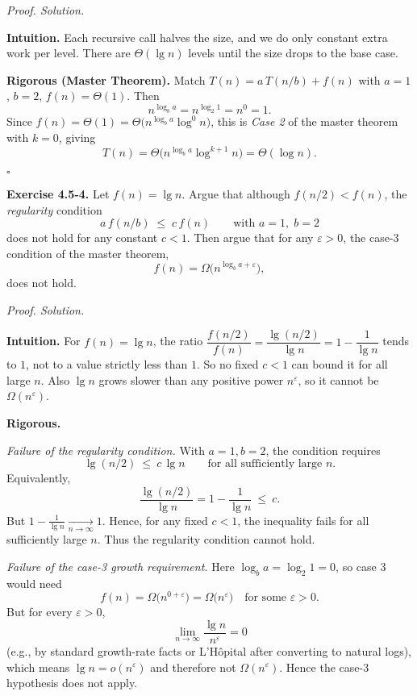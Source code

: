 \documentclass[12pt]{article}
\theoremstyle{definition}
\begin{document}
\medskip
\noindent\textit{Proof. Solution.}

\noindent\textbf{Intuition.}
Each recursive call halves the size, and we do only constant extra work per level.
There are \(\Theta(\lg n)\) levels until the size drops to the base case.

\noindent\textbf{Rigorous (Master Theorem).}
Match \(T(n)=a\,T(n/b)+f(n)\) with \(a=1\), \(b=2\), \(f(n)=\Theta(1)\).
Then
\[
n^{\log_b a}=n^{\log_2 1}=n^0=1.
\]
Since \(f(n)=\Theta(1)=\Theta\!\big(n^{\log_b a}\log^{0}\!n\big)\),
this is \emph{Case 2} of the master theorem with \(k=0\), giving
\[
T(n)=\Theta\!\big(n^{\log_b a}\log^{k+1}\!n\big)
=\Theta(\log n).
\]

\hfill$\square$

\newpage

\noindent\textbf{Exercise 4.5-4.}
Let $f(n)=\lg n$. Argue that although $f(n/2)<f(n)$, the \emph{regularity} condition
\[
a\,f(n/b)\;\le\; c\,f(n)\qquad\text{with }a=1,\;b=2
\]
does not hold for any constant $c<1$. Then argue that for any $\varepsilon>0$,
the case-3 condition of the master theorem,
\[
f(n)=\Omega\!\big(n^{\log_b a+\varepsilon}\big),
\]
does not hold.

\medskip
\noindent\textit{Proof. Solution.}

\noindent\textbf{Intuition.}
For $f(n)=\lg n$, the ratio $\dfrac{f(n/2)}{f(n)}=\dfrac{\lg(n/2)}{\lg n}=1-\dfrac{1}{\lg n}$
tends to $1$, not to a value strictly less than $1$. So no fixed $c<1$ can bound it for all large $n$.
Also $\lg n$ grows slower than any positive power $n^\varepsilon$, so it cannot be $\Omega(n^\varepsilon)$.

\noindent\textbf{Rigorous.}

\emph{Failure of the regularity condition.}
With $a=1,b=2$, the condition requires
\[
\lg(n/2)\ \le\ c\,\lg n\qquad\text{for all sufficiently large }n.
\]
Equivalently,
\[
\frac{\lg(n/2)}{\lg n}=1-\frac{1}{\lg n}\ \le\ c.
\]
But $\displaystyle 1-\frac{1}{\lg n}\xrightarrow[n\to\infty]{}1$.
Hence, for any fixed $c<1$, the inequality fails for all sufficiently large $n$.
Thus the regularity condition cannot hold.

\emph{Failure of the case-3 growth requirement.}
Here $\log_b a=\log_2 1=0$, so case 3 would need
\[
f(n)=\Omega\!\big(n^{0+\varepsilon}\big)=\Omega\!\big(n^{\varepsilon}\big)
\quad\text{for some }\varepsilon>0.
\]
But for every $\varepsilon>0$,
\[
\lim_{n\to\infty}\frac{\lg n}{n^{\varepsilon}}=0
\]
(e.g., by standard growth-rate facts or L’Hôpital after converting to natural logs),
which means $\lg n=o(n^{\varepsilon})$ and therefore not $\Omega(n^{\varepsilon})$.
Hence the case-3 hypothesis does not apply.
\end{document}
